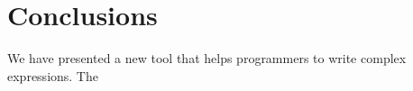 \section{Conclusions}
\label{sec:conclusions}

We have presented a new tool that helps programmers to write complex expressions. 
The 
